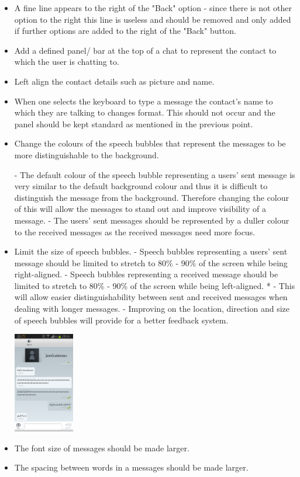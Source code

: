\documentclass[11pt]{article}
\begin{document}
\begin{itemize}
\item A	fine line appears to the right of the "Back" option - since there is not other option to the right this line is useless and should be removed and only added if further options are added to the right of the "Back" button.

\item	Add a defined panel/ bar at the top of a chat to represent the contact to which the user is chatting to. 

\item	Left align the contact details such as picture and name.

\item When one selects the keyboard to type a message the contact's name to which they are talking to changes format. This should not occur and the panel should be kept standard as mentioned in the previous point.

\item	Change the colours of the speech bubbles that represent the messages to be more distinguishable to the background.

\subitem	- The default colour of the speech bubble representing a users’ sent message is very similar to the default background colour and thus it is difficult to distinguish the message from the background. Therefore changing the colour of this will allow the messages to stand out and improve visibility of a message.
\subitem 	- The users’ sent messages should be represented by a duller colour to the received messages as the received messages need more focus.

\item	Limit the size of speech bubbles.
\subitem - Speech bubbles representing a users’ sent message should be limited to stretch to 80\% - 90\% of the screen while being right-aligned.
\subitem	- Speech bubbles representing a received message should be limited to stretch to 80\% - 90\% of the screen while being left-aligned. *
\subitem	- This will allow easier distinguishability between sent and received messages when dealing with longer messages.
\subitem	- Improving on the location, direction and size of speech bubbles will provide for a better feedback system.\\
\centerline{\includegraphics[width=100px]{screen.png}}

\item	The font size of messages should be made larger.

\item	The spacing between words in a messages should be made larger.
\end{itemize}
\end{document}
